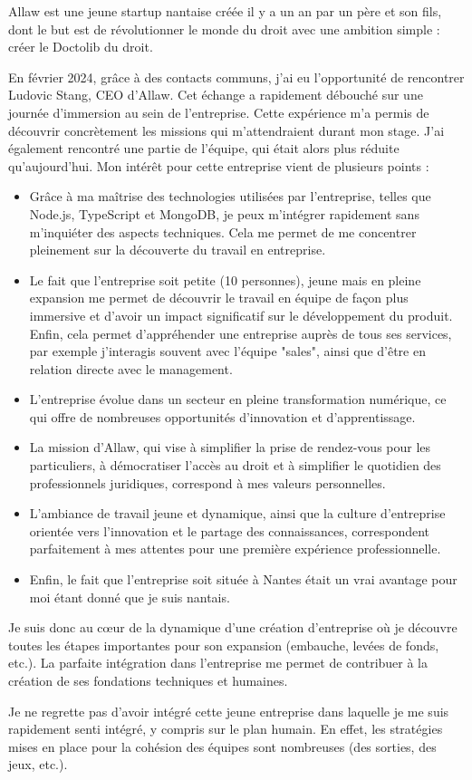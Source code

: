 Allaw est une jeune startup nantaise créée il y a un an par un père et son fils,
dont le but est de révolutionner le monde du droit avec une ambition simple :
créer le Doctolib du droit.

En février 2024, grâce à des contacts communs, j'ai eu l'opportunité de rencontrer Ludovic Stang, CEO d'Allaw.
Cet échange a rapidement débouché sur une journée d'immersion au sein de l'entreprise.
Cette expérience m'a permis de découvrir concrètement les missions qui m'attendraient durant mon stage.
J'ai également rencontré une partie de l'équipe, qui était alors plus réduite qu'aujourd'hui.
Mon intérêt pour cette entreprise vient de plusieurs points :

\begin{itemize}
  \item Grâce à ma maîtrise des technologies utilisées par l'entreprise, telles que Node.js, TypeScript et MongoDB, je peux m'intégrer rapidement sans m'inquiéter des aspects techniques.
Cela me permet de me concentrer pleinement sur la découverte du travail en entreprise.

  \item Le fait que l'entreprise soit petite (10 personnes), jeune mais en pleine
expansion me permet de découvrir le travail en équipe de façon plus immersive
et d'avoir un impact significatif sur le développement du produit. Enfin, cela
permet d'appréhender une entreprise auprès de tous ses services, par exemple
j'interagis souvent avec l'équipe "sales", ainsi que d'être en relation directe
avec le management.

  \item L'entreprise évolue dans un secteur en pleine transformation numérique,
ce qui offre de nombreuses opportunités d'innovation et d'apprentissage.

  \item La mission d'Allaw, qui vise à simplifier la prise de rendez-vous pour les
particuliers, à démocratiser l'accès au droit et à simplifier le quotidien des
professionnels juridiques, correspond à mes valeurs personnelles.

  \item L'ambiance de travail jeune et dynamique, ainsi que la culture d'entreprise
orientée vers l'innovation et le partage des connaissances, correspondent
parfaitement à mes attentes pour une première expérience professionnelle.

  \item Enfin, le fait que l'entreprise soit située à Nantes était un vrai
avantage pour moi étant donné que je suis nantais.
\end{itemize}

Je suis donc au cœur de la dynamique d'une création d'entreprise où je découvre
toutes les étapes importantes pour son expansion (embauche, levées de fonds,
etc.). La parfaite intégration dans l'entreprise me permet de contribuer à la
création de ses fondations techniques et humaines.

Je ne regrette pas d'avoir intégré cette jeune entreprise dans laquelle je
me suis rapidement senti intégré, y compris sur le plan humain. En effet, les
stratégies mises en place pour la cohésion des équipes sont nombreuses (des
sorties, des jeux, etc.).
